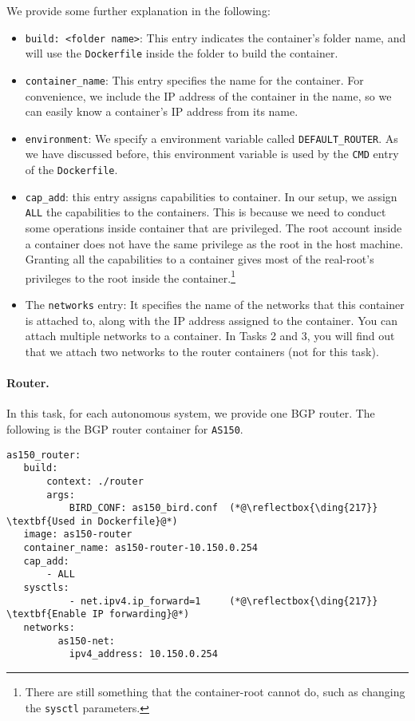 We provide some further explanation in the following: 


\begin{itemize}
\item \texttt{build: <folder name>}: This entry indicates the container's folder
name, and will use the \texttt{Dockerfile} inside the folder to build 
the container.

\item \texttt{container\_name}: This entry specifies the name 
for the container. For convenience, we include the IP 
address of the container in the name, so we can easily know a container's
IP address from its name. 

\item \texttt{environment}: We specify a environment variable 
called \texttt{DEFAULT\_ROUTER}. As we have discussed before, this environment
variable is used by the \texttt{CMD} entry of the \texttt{Dockerfile}.  


\item \texttt{cap\_add}: this entry assigns capabilities to container.  
In our setup, we assign \texttt{ALL} the capabilities to the containers. 
This is because we need to conduct some operations inside container that 
are privileged. The root account inside a container does not have the same 
privilege as the root in the host machine. Granting all the capabilities
to a container gives most of the real-root's privileges to the root 
inside the container.\footnote{There are still something that the container-root 
cannot do, such as changing the \texttt{sysctl} parameters.}


\item The \texttt{networks} entry: 
It specifies the name of the networks that this container is attached to,
along with the IP address assigned to the container. 
You can attach multiple networks to a container. In Tasks 2 and 3,
you will find out that we attach two networks to the router containers (not for
this task).

\end{itemize}
 


\paragraph{Router.} In this task, for each autonomous system,
we provide one BGP router. The following is the BGP router 
container for \texttt{AS150}.  

\begin{lstlisting}
as150_router:
   build:
       context: ./router
       args:
           BIRD_CONF: as150_bird.conf  (*@\reflectbox{\ding{217}} \textbf{Used in Dockerfile}@*)
   image: as150-router
   container_name: as150-router-10.150.0.254
   cap_add:
       - ALL
   sysctls:
           - net.ipv4.ip_forward=1     (*@\reflectbox{\ding{217}} \textbf{Enable IP forwarding}@*)
   networks:
         as150-net:
           ipv4_address: 10.150.0.254
\end{lstlisting}

